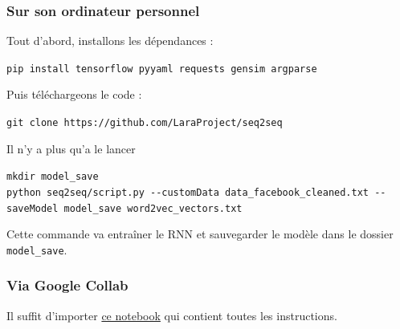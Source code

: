 \documentclass[10pt,a4paper]{article}
\begin{document}
\subsubsection{Sur son ordinateur personnel}
Tout d'abord, installons les dépendances :
\begin{center}
\texttt{pip install tensorflow pyyaml requests gensim argparse}
\end{center}
Puis téléchargeons le code :
\begin{center}
\texttt{git clone https://github.com/LaraProject/seq2seq}
\end{center}
Il n'y a plus qu'a le lancer
\begin{center}
\texttt{mkdir model\_save} \\
\texttt{python seq2seq/script.py -{}-customData data\_facebook\_cleaned.txt -{}-saveModel model\_save  word2vec\_vectors.txt} 
\end{center}
Cette commande va entraîner le RNN et sauvegarder le modèle dans le dossier \texttt{model\_save}.
\subsubsection{Via Google Collab}
Il suffit d'importer \href{https://github.com/LaraProject/notebooks/blob/master/LaraProject_RNN.ipynb}{ce notebook} qui contient toutes les instructions.
\end{document}
